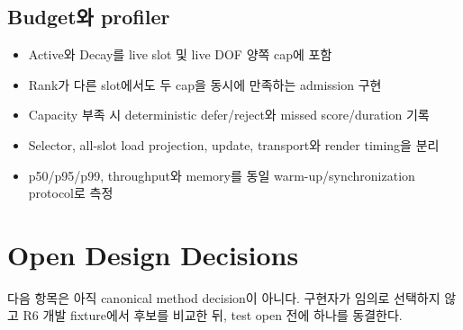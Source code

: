 \documentclass[10pt]{article}
\begin{document}
\subsection{Budget와 profiler}

\begin{itemize}
  \item[$\square$] Active와 Decay를 live slot 및 live DOF 양쪽 cap에 포함
  \item[$\square$] Rank가 다른 slot에서도 두 cap을 동시에 만족하는 admission 구현
  \item[$\square$] Capacity 부족 시 deterministic defer/reject와 missed score/duration 기록
  \item[$\square$] Selector, all-slot load projection, update, transport와 render timing을 분리
  \item[$\square$] p50/p95/p99, throughput와 memory를 동일 warm-up/synchronization protocol로 측정
\end{itemize}

\section{Open Design Decisions}
\label{sec:r6-chapter-5}

다음 항목은 아직 canonical method decision이 아니다. 구현자가 임의로 선택하지 않고 R6 개발 fixture에서
후보를 비교한 뒤, test open 전에 하나를 동결한다.
\end{document}
